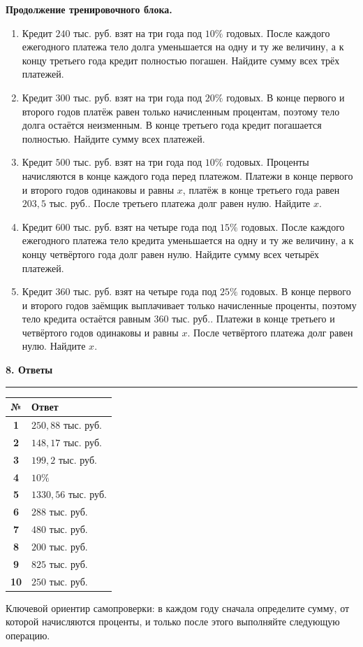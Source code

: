 \documentclass[a4paper,12pt]{article}
\newcommand{\sectiontitle}[1]{%
  \vspace{0.4em}
  {\Large\bfseries\color{darkaccent}#1}\par
  \vspace{0.15em}
  {\color{accent}\rule{\linewidth}{0.6pt}}\par
  \vspace{0.25em}
}
\newcommand{\thrub}{\text{ тыс. руб.}}
\begin{document}
\clearpage
\textbf{Продолжение тренировочного блока.}
\begin{enumerate}[resume]

\item Кредит \(240\thrub\) взят на три года под \(10\%\) годовых.
После каждого ежегодного платежа тело долга уменьшается на одну и ту же величину,
а к концу третьего года кредит полностью погашен.
Найдите сумму всех трёх платежей.

\item Кредит \(300\thrub\) взят на три года под \(20\%\) годовых.
В конце первого и второго годов платёж равен только начисленным процентам,
поэтому тело долга остаётся неизменным.
В конце третьего года кредит погашается полностью.
Найдите сумму всех платежей.

\item Кредит \(500\thrub\) взят на три года под \(10\%\) годовых.
Проценты начисляются в конце каждого года перед платежом.
Платежи в конце первого и второго годов одинаковы и равны \(x\),
платёж в конце третьего года равен \(203{,}5\thrub\).
После третьего платежа долг равен нулю.
Найдите \(x\).

\item Кредит \(600\thrub\) взят на четыре года под \(15\%\) годовых.
После каждого ежегодного платежа тело кредита уменьшается на одну и ту же величину,
а к концу четвёртого года долг равен нулю.
Найдите сумму всех четырёх платежей.

\item Кредит \(360\thrub\) взят на четыре года под \(25\%\) годовых.
В конце первого и второго годов заёмщик выплачивает только начисленные проценты,
поэтому тело кредита остаётся равным \(360\thrub\).
Платежи в конце третьего и четвёртого годов одинаковы и равны \(x\).
После четвёртого платежа долг равен нулю.
Найдите \(x\).
\end{enumerate}

\clearpage

\sectiontitle{8. Ответы}

\renewcommand{\arraystretch}{1.35}
\begin{center}
\begin{tabular}{>{\bfseries}c l}
\toprule
№ & Ответ \\
\midrule
1 & \(250{,}88\thrub\) \\
2 & \(148{,}17\thrub\) \\
3 & \(199{,}2\thrub\) \\
4 & \(10\%\) \\
5 & \(1330{,}56\thrub\) \\
6 & \(288\thrub\) \\
7 & \(480\thrub\) \\
8 & \(200\thrub\) \\
9 & \(825\thrub\) \\
10 & \(250\thrub\) \\
\bottomrule
\end{tabular}
\end{center}

\vfill

{\small\color{textgray}
Ключевой ориентир самопроверки: в каждом году сначала определите сумму,
от которой начисляются проценты, и только после этого выполняйте следующую операцию.
}
\end{document}
